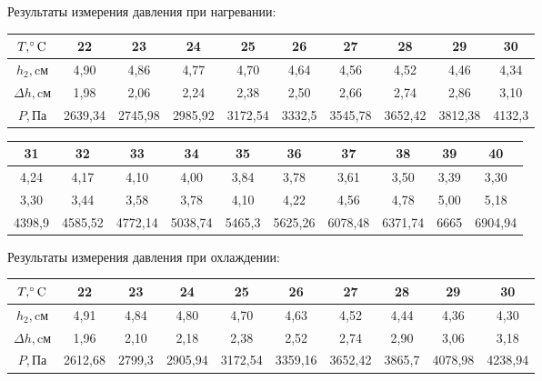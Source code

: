 \documentclass[a4paper, 12pt]{article}
\begin{document}
Результаты измерения давления при нагревании:

\begin{table}[h!]
\begin{tabular}{|c|c|c|c|c|c|c|c|c|c|}
\hline
$T, \celsius$ & 22      & 23      & 24      & 25      & 26     & 27      & 28      & 29      & 30     \\ \hline
$h_2, \text{cм}$ & 4,90    & 4,86    & 4,77    & 4,70    & 4,64   & 4,56    & 4,52    & 4,46    & 4,34   \\ \hline
$\Delta{h}, \text{cм}$ & 1,98    & 2,06    & 2,24    & 2,38    & 2,50   & 2,66    & 2,74    & 2,86    & 3,10   \\ \hline
$P, \text{Па}$  & 2639,34 & 2745,98 & 2985,92 & 3172,54 & 3332,5 & 3545,78 & 3652,42 & 3812,38 & 4132,3 \\ \hline
\end{tabular}
\end{table}

\begin{table}[h!]
\begin{tabular}{|c|c|c|c|c|c|c|c|c|c|}
\hline
31     & 32      & 33      & 34      & 35     & 36      & 37      & 38      & 39   & 40      \\ \hline
4,24   & 4,17    & 4,10    & 4,00    & 3,84   & 3,78    & 3,61    & 3,50    & 3,39 & 3,30    \\ \hline
3,30   & 3,44    & 3,58    & 3,78    & 4,10   & 4,22    & 4,56    & 4,78    & 5,00 & 5,18    \\ \hline
4398,9 & 4585,52 & 4772,14 & 5038,74 & 5465,3 & 5625,26 & 6078,48 & 6371,74 & 6665 & 6904,94 \\ \hline
\end{tabular}
\end{table}
\newpage

Результаты измерения давления при охлаждении:

\begin{table}[h!]
\begin{tabular}{|c|c|c|c|c|c|c|c|c|c|}
\hline
$T, \celsius$ & 22      & 23     & 24      & 25      & 26      & 27      & 28     & 29      & 30      \\ \hline
$h_2, \text{cм}$ & 4,91    & 4,84   & 4,80    & 4,70    & 4,63    & 4,52    & 4,44   & 4,36    & 4,30    \\ \hline
$\Delta{h}, \text{cм}$ & 1,96    & 2,10   & 2,18    & 2,38    & 2,52    & 2,74    & 2,90   & 3,06    & 3,18    \\ \hline
$P, \text{Па}$  & 2612,68 & 2799,3 & 2905,94 & 3172,54 & 3359,16 & 3652,42 & 3865,7 & 4078,98 & 4238,94 \\ \hline
\end{tabular}
\end{table}
\end{document}
